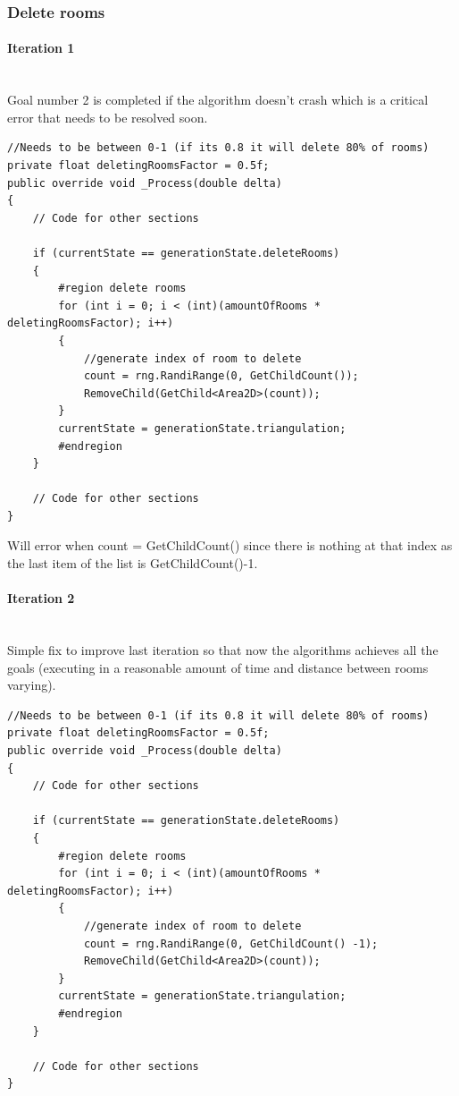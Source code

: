 \documentclass{article}
\newcommand{\myparagraph}[1]{\paragraph{#1}\mbox{}\\} %
\begin{document}
\subsubsection{Delete rooms}
\myparagraph{Iteration 1}
Goal number 2 is completed if the algorithm doesn't crash which is a critical error that needs to be resolved soon.
\begin{lstlisting}
//Needs to be between 0-1 (if its 0.8 it will delete 80% of rooms)
private float deletingRoomsFactor = 0.5f; 
public override void _Process(double delta)
{
    // Code for other sections

    if (currentState == generationState.deleteRooms)
    {
        #region delete rooms
        for (int i = 0; i < (int)(amountOfRooms * deletingRoomsFactor); i++)
        {
        	//generate index of room to delete
            count = rng.RandiRange(0, GetChildCount());
            RemoveChild(GetChild<Area2D>(count));
        }
        currentState = generationState.triangulation;
        #endregion
    }

    // Code for other sections
}
\end{lstlisting}
Will error when count = GetChildCount() since there is nothing at that index as the last item of the list is GetChildCount()-1.

\myparagraph{Iteration 2}
Simple fix to improve last iteration so that now the algorithms achieves all the goals (executing in a reasonable amount of time and distance between rooms varying).
\begin{lstlisting}
//Needs to be between 0-1 (if its 0.8 it will delete 80% of rooms)
private float deletingRoomsFactor = 0.5f; 
public override void _Process(double delta)
{
    // Code for other sections

    if (currentState == generationState.deleteRooms)
    {
        #region delete rooms
        for (int i = 0; i < (int)(amountOfRooms * deletingRoomsFactor); i++)
        {
        	//generate index of room to delete
            count = rng.RandiRange(0, GetChildCount() -1);
            RemoveChild(GetChild<Area2D>(count));
        }
        currentState = generationState.triangulation;
        #endregion
    }

    // Code for other sections
}
\end{lstlisting}
\end{document}
